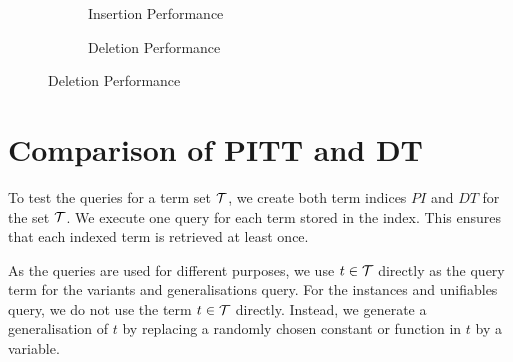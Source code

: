 \begin{figure}[h]
  \begin{subfigure}{0.45\textwidth}
\begin{adjustbox}{width=1\textwidth}
\end{adjustbox}
\caption{Insertion Performance}
\label{pi_insert}
\end{subfigure}
\begin{subfigure}{0.1\textwidth}
\end{subfigure}
\begin{subfigure}{0.45\textwidth}
\begin{adjustbox}{width=1\textwidth}
\end{adjustbox}
\caption{Deletion Performance}
\label{pi_delete}
\end{subfigure}
\end{figure}

\section{Comparison of PITT and DT}
To test the queries for a term set $\mathcal{T}$, we create both term indices $PI$ and $DT$ for the set $\mathcal{T}$. We execute one query for each term stored in the index. This ensures that each indexed term is retrieved at least once.

As the queries are used for different purposes, we use $t \in \mathcal{T}$ directly as the query term for the variants and generalisations query.
For the instances and unifiables query, we do not use the term $t \in \mathcal{T}$ directly.
Instead, we generate a generalisation of $t$ by replacing a randomly chosen constant or function in $t$ by a variable.

